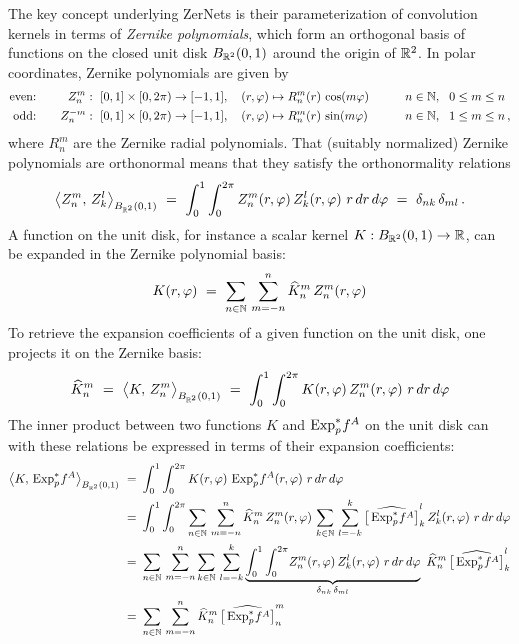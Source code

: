 The key concept underlying ZerNets is their parameterization of convolution kernels in terms of \emph{Zernike polynomials}, which form an orthogonal basis of functions on the closed unit disk $B_{\mathbb{R}^2}(0,1)$ around the origin of $\mathbb{R}^2$.
In polar coordinates, Zernike polynomials are given by
\begin{alignat}{3}
    \textup{even:}\quad&&
        Z_n^m    &:\ [0,1]\times[0,2\pi) \to [-1,1], \quad (r,\varphi) \mapsto R_n^m(r)\, \cos(m\varphi)
        \qquad&& n\in\mathbb{N},\ \ 0\leq m\leq n \\
    \textup{odd:}\quad&&
        Z_n^{-m} &:\ [0,1]\times[0,2\pi) \to [-1,1], \quad (r,\varphi) \mapsto R_n^m(r)\, \sin(m\varphi)
        \qquad&& n\in\mathbb{N},\ \ 1\leq m\leq n \,,
\end{alignat}
where $R_n^m$ are the Zernike radial polynomials.
That (suitably normalized) Zernike polynomials are orthonormal means that they satisfy the orthonormality relations
\begin{align}
    \big\langle Z_n^m,\, Z_k^l \big\rangle_{B_{\mathbb{R}^2}(0,1)}
    \ =\ \int_0^1 \int_0^{2\pi} Z_n^m(r,\varphi)\, Z_k^l(r,\varphi)\ r\, dr\, d\varphi
    \ =\ \delta_{nk}\, \delta_{ml} \,.
\end{align}
A function on the unit disk, for instance a scalar kernel $K: B_{\mathbb{R}^2}(0,1) \to \mathbb{R}$, can be expanded in the Zernike polynomial basis:
\begin{align}
    K(r,\varphi)\ =\ \sum_{n\in\mathbb{N}}\, \sum_{m=-n}^n \widehat{K}_n^m\, Z_n^m(r,\varphi)
\end{align}
To retrieve the expansion coefficients of a given function on the unit disk, one projects it on the Zernike basis:
\begin{align}
    \widehat{K}_n^m
    \ =\ \big\langle K,\, Z_n^m \big\rangle_{B_{\mathbb{R}^2}(0,1)}
    \ =\ \int_0^1 \int_0^{2\pi} K(r,\varphi)\, Z_n^m(r,\varphi)\ r\, dr\, d\varphi
\end{align}
The inner product between two functions $K$ and $\operatorname{Exp}^*_p\mkern-2mu f^A$ on the unit disk can with these relations be expressed in terms of their expansion coefficients:
\begin{align}\label{eq:zernike_kernel_matching}
    \big\langle K,\, \Expspf^A \big\rangle_{B_{\R^2}(0,1)}
    \ =&\ \int_0^1 \int_0^{2\pi} K(r,\varphi)\, \Expspf^A(r,\varphi)\ r\, dr\, d\varphi \notag \\
    \ =&\ \int_0^1 \int_0^{2\pi}
        \sum_{n\in\N}\, \sum_{m=-n}^n \widehat{K}_n^m\, Z_n^m(r,\varphi)\,
        \sum_{k\in\N}\, \sum_{l=-k}^k \widehat{\big[\Expspf^A\big]}_k^l\, Z_k^l(r,\varphi)\ 
        r\, dr\, d\varphi \notag \\
    \ =&\ 
        \sum_{n\in\N}\, \sum_{m=-n}^n 
        \sum_{k\in\N}\, \sum_{l=-k}^k 
        \underbrace{\int_0^1 \int_0^{2\pi}\!
        Z_n^m(r,\varphi)\, Z_k^l(r,\varphi)\ 
        r\, dr\, d\varphi}_{\delta_{nk}\, \delta_{ml}}\ 
        \widehat{K}_n^m\, \widehat{\big[\Expspf^A\big]}_k^l \notag \\
    \ =&\ 
        \sum_{n\in\N}\, \sum_{m=-n}^n 
        \widehat{K}_n^m\, \widehat{\big[\Expspf^A\big]}_n^m
\end{align}
